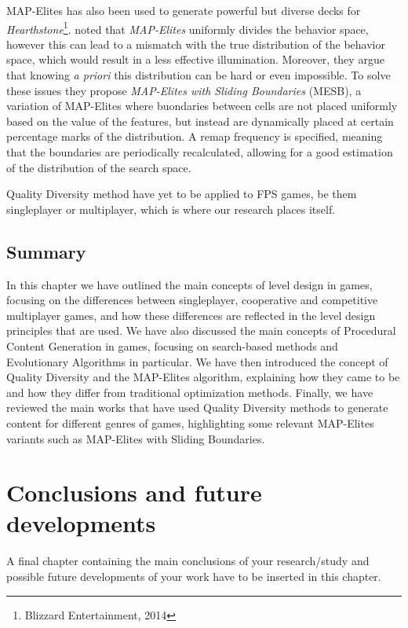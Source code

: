 \documentclass{Configuration_Files/PoliMi3i_thesis}
\begin{document}
MAP-Elites has also been used to generate powerful but diverse decks for \textit{Hearthstone}\footnote{Blizzard Entertainment, 2014}. \citeauthor{fontaine_mapping_2019} noted that \textit{MAP-Elites} uniformly divides the behavior space, however this can lead to a mismatch with the true distribution of the behavior space, which would result in a less effective illumination. Moreover, they argue that knowing \textit{a priori} this distribution can be hard or even impossible. To solve these issues they propose \textit{MAP-Elites with Sliding Boundaries} (MESB), a variation of MAP-Elites where buondaries between cells are not placed uniformly based on the value of the features, but instead are dynamically placed at certain percentage marks of the distribution. A remap frequency is specified, meaning that the boundaries are periodically recalculated, allowing for a good estimation of the distribution of the search space. \cite{fontaine_mapping_2019}

Quality Diversity method have yet to be applied to FPS games, be them singleplayer or multiplayer, which is where our research places itself.

\section{Summary}
In this chapter we have outlined the main concepts of level design in games, focusing on the differences between singleplayer, cooperative and competitive multiplayer games, and how these differences are reflected in the level design principles that are used. We have also discussed the main concepts of Procedural Content Generation in games, focusing on search-based methods and Evolutionary Algorithms in particular. We have then introduced the concept of Quality Diversity and the MAP-Elites algorithm, explaining how they came to be and how they differ from traditional optimization methods. Finally, we have reviewed the main works that have used Quality Diversity methods to generate content for different genres of games, highlighting some relevant MAP-Elites variants such as MAP-Elites with Sliding Boundaries.

\chapter{Conclusions and future developments}
\label{ch:conclusions}%
A final chapter containing the main conclusions of your research/study
and possible future developments of your work have to be inserted in this chapter.
\end{document}
